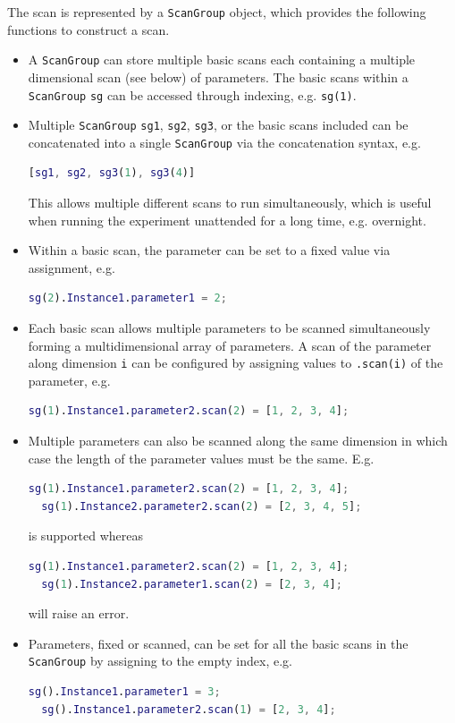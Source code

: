 The scan is represented by a \verb`ScanGroup` object,
which provides the following functions to construct a scan.
\begin{itemize}
\item A \verb`ScanGroup` can store multiple basic scans each containing
  a multiple dimensional scan (see below) of parameters.
  The basic scans within a \verb`ScanGroup` \verb`sg` can be accessed through
  indexing, e.g. \verb`sg(1)`.
\item Multiple \verb`ScanGroup` \verb`sg1`, \verb`sg2`, \verb`sg3`, or the basic scans included
  can be concatenated into a single \verb`ScanGroup` via the concatenation syntax, e.g.
  \begin{lstlisting}[language=Matlab]
  [sg1, sg2, sg3(1), sg3(4)]
\end{lstlisting}
  This allows multiple different scans to run simultaneously,
  which is useful when running the experiment unattended for a long time, e.g. overnight.
\item Within a basic scan,
  the parameter can be set to a fixed value via assignment, e.g.
  \begin{lstlisting}[language=Matlab]
  sg(2).Instance1.parameter1 = 2;
\end{lstlisting}
\item Each basic scan allows multiple parameters to be scanned simultaneously
  forming a multidimensional array of parameters.
  A scan of the parameter along dimension \verb`i` can be configured
  by assigning values to \verb`.scan(i)` of the parameter, e.g.
  \begin{lstlisting}[language=Matlab]
  sg(1).Instance1.parameter2.scan(2) = [1, 2, 3, 4];
\end{lstlisting}
\item Multiple parameters can also be scanned along the same dimension
  in which case the length of the parameter values must be the same. E.g.
  \begin{lstlisting}[language=Matlab]
  sg(1).Instance1.parameter2.scan(2) = [1, 2, 3, 4];
  sg(1).Instance2.parameter2.scan(2) = [2, 3, 4, 5];
\end{lstlisting}
  is supported whereas
  \begin{lstlisting}[language=Matlab]
  sg(1).Instance1.parameter2.scan(2) = [1, 2, 3, 4];
  sg(1).Instance2.parameter1.scan(2) = [2, 3, 4];
\end{lstlisting}
  will raise an error.
\item Parameters, fixed or scanned, can be set for all the basic scans in the \verb`ScanGroup`
  by assigning to the empty index, e.g.
  \begin{lstlisting}[language=Matlab]
  sg().Instance1.parameter1 = 3;
  sg().Instance1.parameter2.scan(1) = [2, 3, 4];
\end{lstlisting}
\end{itemize}


